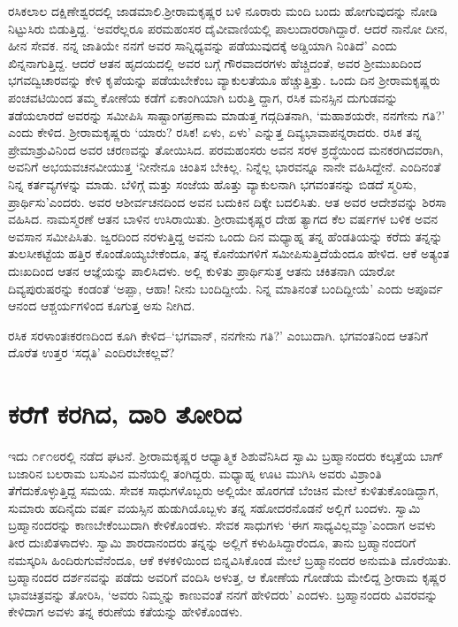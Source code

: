 ರಸಿಕಲಾಲ ದಕ್ಷಿಣೇಶ್ವರದಲ್ಲಿ ಜಾಡಮಾಲಿ.ಶ‍್ರೀರಾಮಕೃಷ್ಣರ ಬಳಿ ನೂರಾರು ಮಂದಿ ಬಂದು ಹೋಗುವುದನ್ನು ನೋಡಿ ನಿಟ್ಟುಸಿರು ಬಿಡುತ್ತಿದ್ದ. ‘ಅವರೆಲ್ಲರೂ ಪರಮಹಂಸರ ದೈವೀವಾಣಿಯಲ್ಲಿ ಪಾಲುದಾರರಾಗಿದ್ದಾರೆ. ಆದರೆ ನಾನೋ ದೀನ, ಹೀನ ಸೇವಕ. ನನ್ನ ಜಾತಿಯೇ ನನಗೆ ಅವರ ಸಾನ್ನಿಧ್ಯವನ್ನು ಪಡೆಯುವುದಕ್ಕೆ ಅಡ್ಡಿಯಾಗಿ ನಿಂತಿದೆ’ ಎಂದು ಖಿನ್ನನಾಗುತ್ತಿದ್ದ. ಆದರೆ ಆತನ ಹೃದಯದಲ್ಲಿ ಅವರ ಬಗ್ಗೆ ಗೌರವಾದರಗಳು ಹೆಚ್ಚಿದಂತೆ, ಅವರ ಶ‍್ರೀಮುಖದಿಂದ ಭಗವದ್ವಿಚಾರವನ್ನು ಕೇಳಿ ಕೃಪೆಯನ್ನು ಪಡೆಯಬೇಕೆಂಬ ವ್ಯಾಕುಲತೆಯೂ ಹೆಚ್ಚುತ್ತಿತ್ತು. ಒಂದು ದಿನ ಶ‍್ರೀರಾಮಕೃಷ್ಣರು ಪಂಚವಟಿಯಿಂದ ತಮ್ಮ ಕೋಣೆಯ ಕಡೆಗೆ ಏಕಾಂಗಿಯಾಗಿ ಬರುತ್ತಿ ದ್ದಾಗ, ರಸಿಕ ಮನಸ್ಸಿನ ದುಗುಡವನ್ನು ತಡೆಯಲಾರದೆ ಅವರನ್ನು ಸಮೀಪಿಸಿ ಸಾಷ್ಟಾಂಗ\break ಪ್ರಣಾಮ ಮಾಡುತ್ತ ಗದ್ಗದಿತನಾಗಿ, ‘ಮಹಾಶಯರೇ, ನನಗೇನು ಗತಿ?’ ಎಂದು ಕೇಳಿದ. ಶ‍್ರೀರಾಮಕೃಷ್ಣರು ‘ಯಾರು? ರಸಿಕ! ಏಳು, ಏಳು’ ಎನ್ನುತ್ತ ದಿವ್ಯಭಾವಾಪನ್ನರಾದರು. ರಸಿಕ ತನ್ನ ಪ್ರೇಮಾಶ್ರುವಿನಿಂದ ಅವರ ಚರಣವನ್ನು ತೋಯಿಸಿದ. ಪರಮಹಂಸರು ಅವನ ಸರಳ ಶ್ರದ್ಧೆಯಿಂದ ಮನಕರಗಿದವರಾಗಿ, ಅವನಿಗೆ ಅಭಯವಚನವೀಯುತ್ತ ‘ನೀನೇನೂ ಚಿಂತಿಸ ಬೇಕಿಲ್ಲ. ನಿನ್ನೆಲ್ಲ ಭಾರವನ್ನೂ ನಾನೇ ವಹಿಸಿದ್ದೇನೆ. ಎಂದಿನಂತೆ ನಿನ್ನ ಕರ್ತವ್ಯಗಳನ್ನು ಮಾಡು. ಬೆಳಿಗ್ಗೆ ಮತ್ತು ಸಂಜೆಯ ಹೊತ್ತು ವ್ಯಾಕುಲನಾಗಿ ಭಗವಂತನನ್ನು ಬಿಡದೆ ಸ್ಮರಿಸು, ಪ್ರಾರ್ಥಿಸು’\break ಎಂದರು. ಅವರ ಆಶೀರ್ವಚನದಿಂದ ಅವನ ಬದುಕಿನ ದಿಕ್ಕೇ ಬದಲಿಸಿತು. ಆತ ಅವರ ಆದೇಶವನ್ನು ಶಿರಸಾ ವಹಿಸಿದ. ನಾಮಸ್ಮರಣೆ ಆತನ ಬಾಳಿನ ಉಸಿರಾಯಿತು. ಶ‍್ರೀರಾಮಕೃಷ್ಣರ ದೇಹ ತ್ಯಾಗದ ಕೆಲ ವರ್ಷಗಳ ಬಳಿಕ ಅವನ ಅವಸಾನ ಸಮೀಪಿಸಿತು. ಜ್ವರದಿಂದ ನರಳುತ್ತಿದ್ದ ಅವನು ಒಂದು ದಿನ ಮಧ್ಯಾಹ್ನ ತನ್ನ ಹೆಂಡತಿಯನ್ನು ಕರೆದು ತನ್ನನ್ನು ತುಲಸೀಕಟ್ಟೆಯ ಹತ್ತಿರ ಕೊಂಡೊಯ್ಯಬೇಕೆಂದೂ, ತನ್ನ ಕೊನೆಯಗಳಿಗೆ ಸಮೀಪಿಸುತ್ತಿದೆಯೆಂದೂ ಹೇಳಿದ. ಆಕೆ ಅತ್ಯಂತ ದುಃಖದಿಂದ ಆತನ ಆಜ್ಞೆಯನ್ನು ಪಾಲಿಸಿದಳು. ಅಲ್ಲಿ ಕುಳಿತು ಪ್ರಾರ್ಥಿಸುತ್ತ ಆತನು ಚಕಿತನಾಗಿ ಯಾರೋ ದಿವ್ಯಪುರುಷರನ್ನು ಕಂಡಂತೆ ‘ಅಪ್ಪಾ, ಆಹಾ! ನೀನು ಬಂದಿದ್ದೀಯೆ. ನಿನ್ನ ಮಾತಿನಂತೆ ಬಂದಿದ್ದೀಯೆ’ ಎಂದು ಅಪೂರ್ವ ಆನಂದ ಆಶ್ಚರ್ಯಗಳಿಂದ ಕೂಗುತ್ತ ಅಸು ನೀಗಿದ.

ರಸಿಕ ಸರಳಾಂತಃಕರಣದಿಂದ ಕೂಗಿ ಕೇಳಿದ–‘ಭಗವಾನ್, ನನಗೇನು ಗತಿ?’ ಎಂಬುದಾಗಿ. ಭಗವಂತನಿಂದ ಆತನಿಗೆ ದೊರೆತ ಉತ್ತರ ‘ಸದ್ಗತಿ’ ಎಂದಿರಬೇಕಲ್ಲವೆ?


\section*{ಕರೆಗೆ ಕರಗಿದ, ದಾರಿ ತೋರಿದ}


ಇದು ೧೯೧೮ರಲ್ಲಿ ನಡೆದ ಘಟನೆ. ಶ‍್ರೀರಾಮಕೃಷ್ಣರ ಆಧ್ಯಾತ್ಮಿಕ ಶಿಶುವೆನಿಸಿದ ಸ್ವಾಮಿ ಬ್ರಹ್ಮಾ\-ನಂದರು ಕಲ್ಕತ್ತೆಯ ಬಾಗ್​ಬಜಾರಿನ ಬಲರಾಮ ಬಸುವಿನ ಮನೆಯಲ್ಲಿ ತಂಗಿದ್ದರು. ಮಧ್ಯಾಹ್ನ ಊಟ ಮುಗಿಸಿ ಅವರು ವಿಶ್ರಾಂತಿ ತೆಗೆದುಕೊಳ್ಳುತ್ತಿದ್ದ ಸಮಯ. ಸೇವಕ ಸಾಧುಗಳೊಬ್ಬರು ಅಲ್ಲಿಯೇ ಹೊರಗಡೆ ಬೆಂಚಿನ ಮೇಲೆ ಕುಳಿತುಕೊಂಡಿದ್ದಾಗ, ಸುಮಾರು ಹದಿನೈದು ವರ್ಷ ವಯಸ್ಸಿನ ಹುಡುಗಿಯೊಬ್ಬಳು ತನ್ನ ಸಹೋದರನೊಡನೆ ಅಲ್ಲಿಗೆ ಬಂದಳು. ಸ್ವಾಮಿ ಬ್ರಹ್ಮಾ\-ನಂದರನ್ನು ಕಾಣಬೇಕೆಂಬುದಾಗಿ ಕೇಳಿಕೊಂಡಳು. ಸೇವಕ ಸಾಧುಗಳು ‘ಈಗ ಸಾಧ್ಯವಿಲ್ಲಮ್ಮಾ’\break ಎಂದಾಗ ಅವಳು ತೀರ ದುಃಖಿತಳಾದಳು. ಸ್ವಾಮಿ ಶಾರದಾನಂದರು ತನ್ನನ್ನು ಅಲ್ಲಿಗೆ ಕಳುಹಿಸಿ\-ದ್ದಾರೆಂದೂ, ತಾನು ಬ್ರಹ್ಮಾನಂದರಿಗೆ ನಮಸ್ಕರಿಸಿ ಹಿಂದಿರುಗುವೆನೆಂದೂ, ಆಕೆ ಕಳಕಳಿಯಿಂದ ಬಿನ್ನವಿಸಿಕೊಂಡ ಮೇಲೆ ಬ್ರಹ್ಮಾನಂದರ ಅನುಮತಿ ದೊರೆಯಿತು. ಬ್ರಹ್ಮಾನಂದರ ದರ್ಶನವನ್ನು ಪಡೆದು ಅವರಿಗೆ ವಂದಿಸಿ ಅಳುತ್ತ, ಆ ಕೋಣೆಯ ಗೋಡೆಯ ಮೇಲಿದ್ದ ಶ‍್ರೀರಾಮ ಕೃಷ್ಣರ ಭಾವಚಿತ್ರವನ್ನು ತೋರಿಸಿ, ‘ಅವರು ನಿಮ್ಮನ್ನು ಕಾಣುವಂತೆ ನನಗೆ ಹೇಳಿದರು’ ಎಂದಳು. ಬ್ರಹ್ಮಾನಂದರು ವಿವರವನ್ನು ಕೇಳಿದಾಗ ಅವಳು ತನ್ನ ಕರುಣೆಯ ಕತೆಯನ್ನು ಹೇಳಿಕೊಂಡಳು.

